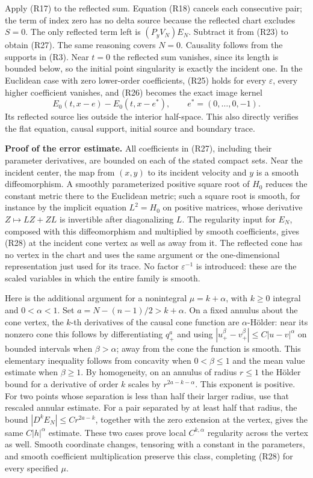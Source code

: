 \documentclass[
  11pt,
]{article}
\begin{document}
Apply (R17) to the reflected sum. Equation (R18) cancels each
consecutive pair; the term of index zero has no delta source because the
reflected chart excludes \(S=0\). The only reflected term left is
\((P_yV_N)E_N\). Subtract it from (R23) to obtain (R27). The same
reasoning covers \(N=0\). Causality follows from the supports in (R3).
Near \(t=0\) the reflected sum vanishes, since its length is bounded
below, so the initial point singularity is exactly the incident one. In
the Euclidean case with zero lower-order coefficients, (R25) holds for
every \(\varepsilon\), every higher coefficient vanishes, and (R26)
becomes the exact image kernel \[
 E_0(t,x-e)-E_0(t,x-e^*),\qquad e^*=(0,\ldots,0,-1).          \tag{R29}
\] Its reflected source lies outside the interior half-space. This also
directly verifies the flat equation, causal support, initial source and
boundary trace.

\textbf{Proof of the error estimate.} All coefficients in (R27),
including their parameter derivatives, are bounded on each of the stated
compact sets. Near the incident center, the map from \((x,y)\) to its
incident velocity and \(y\) is a smooth diffeomorphism. A smoothly
parameterized positive square root of \(H_0\) reduces the constant
metric there to the Euclidean metric; such a square root is smooth, for
instance by the implicit equation \(L^2=H_0\) on positive matrices,
whose derivative \(Z\mapsto LZ+ZL\) is invertible after diagonalizing
\(L\). The regularity input for \(E_N\), composed with this
diffeomorphism and multiplied by smooth coefficients, gives (R28) at the
incident cone vertex as well as away from it. The reflected cone has no
vertex in the chart and uses the same argument or the one-dimensional
representation just used for its trace. No factor \(\varepsilon^{-1}\)
is introduced: these are the scaled variables in which the entire family
is smooth.

Here is the additional argument for a nonintegral \(\mu=k+\alpha\), with
\(k\geq0\) integral and \(0<\alpha<1\). Set \(a=N-(n-1)/2>k+\alpha\). On
a fixed annulus about the cone vertex, the \(k\)-th derivatives of the
causal cone function are \(\alpha\)-Hölder: near its nonzero cone this
follows by differentiating \(q_+^a\) and using
\(|u_+^\beta-v_+^\beta|\leq C|u-v|^\alpha\) on bounded intervals when
\(\beta>\alpha\); away from the cone the function is smooth. This
elementary inequality follows from concavity when \(0<\beta\leq1\) and
the mean value estimate when \(\beta\geq1\). By homogeneity, on an
annulus of radius \(r\leq1\) the Hölder bound for a derivative of order
\(k\) scales by \(r^{2a-k-\alpha}\). This exponent is positive. For two
points whose separation is less than half their larger radius, use that
rescaled annular estimate. For a pair separated by at least half that
radius, the bound \(|D^kE_N|\leq Cr^{2a-k}\), together with the zero
extension at the vertex, gives the same \(C|h|^\alpha\) estimate. These
two cases prove local \(C^{k,\alpha}\) regularity across the vertex as
well. Smooth coordinate changes, tensoring with a constant in the
parameters, and smooth coefficient multiplication preserve this class,
completing (R28) for every specified \(\mu\).
\end{document}

